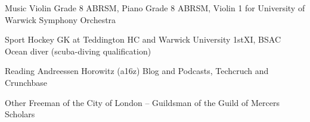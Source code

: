 
\begin{cvskills}

  \cvskill
    {Music} %
    {Violin Grade 8 ABRSM, Piano Grade 8 ABRSM, Violin 1 for University of Warwick Symphony Orchestra} %

  \cvskill
    {Sport} %
 {Hockey GK at Teddington HC and Warwick University 1stXI, BSAC Ocean diver (scuba-diving qualification)} %

  \cvskill
    {Reading} %
    {Andreessen Horowitz (a16z) Blog and Podcasts, Techcruch and Crunchbase} %
  
  \cvskill
    {Other} %
    {Freeman of the City of London -- Guildsman of the Guild of Mercers Scholars} %
    
\end{cvskills}

